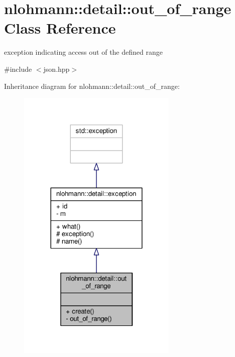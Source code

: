\hypertarget{classnlohmann_1_1detail_1_1out__of__range}{}\section{nlohmann\+:\+:detail\+:\+:out\+\_\+of\+\_\+range Class Reference}
\label{classnlohmann_1_1detail_1_1out__of__range}


exception indicating access out of the defined range  




{\ttfamily \#include $<$json.\+hpp$>$}



Inheritance diagram for nlohmann\+:\+:detail\+:\+:out\+\_\+of\+\_\+range\+:
\nopagebreak
\begin{figure}[H]
\begin{center}
\leavevmode
\includegraphics[width=216pt]{classnlohmann_1_1detail_1_1out__of__range__inherit__graph}
\end{center}
\end{figure}


